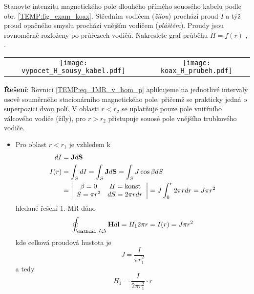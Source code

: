 \begin{example}\label{TEMP:ex_koax_H}
  Stanovte intenzitu magnetického pole dlouhého přímého souosého kabelu podle obr.
  \ref{TEMP:fig_exam_koax}. Středním vodičem (\emph{žílou}) prochází proud $I$ a týž proud 
  opačného smyslu prochází vnějším vodičem (\emph{pláštěm}). Proudy jsou rovnoměrně rozloženy po 
  průřezech vodičů. Nakreslete graf průběhu $H = f(r)$ \cite[s.~92]{Dufek1970},
  \cite[s.~195]{Kotlan1999}.
  
  {\centering
   \begin{tabular}{cc}
     \texttt{[image: vypocet\_H\_sousy\_kabel.pdf]}   &
     \texttt{[image: koax\_H\_prubeh.pdf]}
  \end{tabular}
  \captionsetup{type=figure}
  \label{TEMP:fig_exam_koax}
  \par}
  
  \textbf{Řešení}: \newline Rovnici \ref{TEMP:eq_1MR_v_hom_p} aplikujeme na jednotlivé intervaly 
  osově souměrného stacionárního magnetického pole, přičemž se prakticky jedná o superpozici dvou
  polí. V oblasti $r<r_2$ se uplatňuje pouze pole vnitřního válcového vodiče (žíly), pro $r>r_2$ 
  přistupuje souosé pole vnějšího trubkového vodiče.
  \begin{itemize}
    \item Pro oblast $r<r_1$ je vzhledem k 
          \begin{align*}
              dI   &= \mathbf{J}d\mathbf{S} \\
              I(r) &= \int_S dI = \int_S \mathbf{J}d\mathbf{S} = \int_S J\cos\beta dS \\
                   &= \left|\begin{array}{cc}
                               \beta = 0 & H = \text{konst} \\
                             S = \pi r^2 & dS = 2\pi rdr \\
                            \end{array}
                      \right| = J\int_0^r 2\pi rdr = J\pi r^2
          \end{align*}
          hledané řešení 1. MR dáno 
          $$\oint_{\mathcal{c}}\vr{H}d\vr{l} = H_1 2\pi r = I(r) = J\pi r^2$$ kde celková proudová
          hustota je  $$J = \frac{I}{\pi r_1^2}$$ a tedy $$H_1 = \frac{I}{2\pi r_1^2}\cdot r$$
          

\end{itemize}
\end{example}
